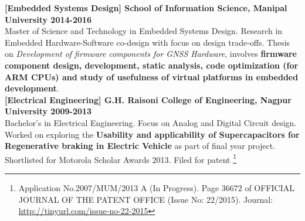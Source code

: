 
\reversemarginpar {}
\noindent \textbf{\textcolor{ultramarine}{[Embedded Systems Design] School of Information Science, Manipal University \hfill 2014-2016}
}\\
Master of Science and Technology in Embedded Systems Design. Research in Embedded Hardware-Software co-design with focus on design trade-offs. Thesis on \textit {Development of firmware components for GNSS Hardware}, involves \textbf{firmware component design, development, static analysis, code optimization (for ARM CPUs) and study of usefulness of virtual platforms in embedded development}.\\

\noindent \textbf{\textcolor{ultramarine}{[Electrical Engineering] G.H. Raisoni College of Engineering, Nagpur University \hfill 2009-2013}
}\\
Bachelor's in Electrical Engineering. Focus on Analog and Digital Circuit design. Worked on exploring the \textbf{Usability and applicability of Supercapacitors for Regenerative braking in Electric Vehicle} as part of final year project. Shortlisted for Motorola Scholar Awards 2013. Filed for patent \footnote{Application No.2007/MUM/2013 A (In Progress). Page 36672 of OFFICIAL JOURNAL OF THE PATENT OFFICE (Issue No: 22/2015).
Journal: \url{http://tinyurl.com/issue-no-22-2015}}
\\

